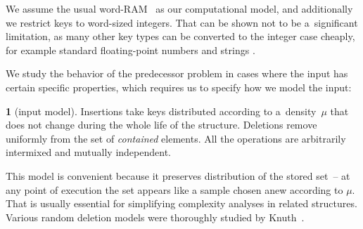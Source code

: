 \documentclass[
submission
]{dmtcs-episciences}
\theoremstyle{plain}
\theoremstyle{definition}
\newtheorem{defn}[thm]{\protect\definitionname}
\theoremstyle{remark}
\theoremstyle{plain}
\theoremstyle{plain}
\providecommand{\definitionname}{Definition}
\begin{document}
We assume the usual word-RAM~\cite{HagerupT98}
as our computational model, and additionally we restrict keys to word-sized
integers. That can be shown not to be a~significant limitation, as
many other key types can be converted to the integer case cheaply,
for example standard floating-point numbers \cite[sec. 2.1.3]{Goldberg91}
and strings \cite{AndersT01}.

We study the behavior of the predecessor problem in cases where the input
has certain specific properties, which requires us to specify how we model the input:
\begin{defn}[input model]
Insertions take keys distributed according to a~density~$\mu$ that
does not change during the whole life of the structure. Deletions
remove uniformly from the set of \emph{contained} elements. All the
operations are arbitrarily intermixed and mutually independent.
\end{defn}
This model is convenient because it preserves distribution of the
stored set~– at any point of execution the set appears like a sample
chosen anew according to $\mu$. That is usually essential for simplifying complexity
analyses in related structures. Various random deletion models were
thoroughly studied by Knuth~\cite{Knuth77}.
\end{document}
